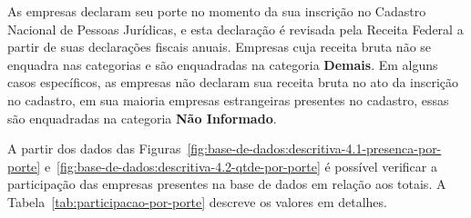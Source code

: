 As empresas declaram seu porte no momento da sua inscrição no Cadastro Nacional de Pessoas Jurídicas, e esta declaração é revisada pela Receita Federal a partir de suas declarações fiscais anuais. Empresas cuja receita bruta não se enquadra nas categorias  e  são enquadradas na categoria \textbf{Demais}. Em alguns casos específicos, as empresas não declaram sua receita bruta no ato da inscrição no cadastro, em sua maioria empresas estrangeiras presentes no cadastro, essas são enquadradas na categoria \textbf{Não Informado}.

A partir dos dados das Figuras~\ref{fig:base-de-dados:descritiva-4.1-presenca-por-porte} e~\ref{fig:base-de-dados:descritiva-4.2-qtde-por-porte} é possível verificar a participação das empresas presentes na base de dados em relação aos totais. A Tabela~\ref{tab:participacao-por-porte} descreve os valores em detalhes.

